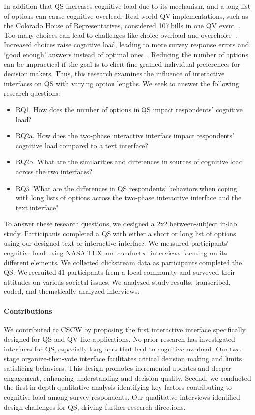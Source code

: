 In addition that QS increases cognitive load due to its mechanism, and a long list of options can cause cognitive overload. Real-world QV implementations, such as the Colorado House of Representatives, considered 107 bills in one QV event~\cite{QuadraticVotingColorado}. Too many choices can lead to challenges like choice overload and overchoice~\cite{iyengarWhenChoiceDemotivating2000, gourvilleOverchoiceAssortmentType2005}. Increased choices raise cognitive load, leading to more survey response errors and ‘good enough’ answers instead of optimal ones~\cite{lenznerCognitiveBurdenSurvey2010, blessAskingDifficultQuestions1992}. Reducing the number of options can be impractical if the goal is to elicit fine-grained individual preferences for decision makers. Thus, this research examines the influence of interactive interfaces on QS with varying option lengths. We seek to answer the following research questions:

\begin{itemize}
    \item RQ1. How does the number of options in QS impact respondents' cognitive load?
    \item RQ2a. How does the two-phase interactive interface impact respondents' cognitive load compared to a text interface?
    \item RQ2b. What are the similarities and differences in sources of cognitive load across the two interfaces?
    \item RQ3. What are the differences in QS respondents' behaviors when coping with long lists of options across the two-phase interactive interface and the text interface?
\end{itemize}

To answer these research questions, we designed a 2x2 between-subject in-lab study. Participants completed a QS with either a short or long list of options using our designed text or interactive interface. We measured participants' cognitive load using NASA-TLX and conducted interviews focusing on its different elements. We collected clickstream data as participants completed the QS. We recruited 41 participants from a local community and surveyed their attitudes on various societal issues. We analyzed study results, transcribed, coded, and thematically analyzed interviews.

\paragraph{Contributions}
We contributed to CSCW by proposing the first interactive interface specifically designed for QS and QV-like applications. No prior research has investigated interfaces for QS, especially long ones that lead to cognitive overload. Our two-stage organize-then-vote interface facilitates critical decision making and limits satisficing behaviors. This design promotes incremental updates and deeper engagement, enhancing understanding and decision quality. Second, we conducted the first in-depth qualitative analysis identifying key factors contributing to cognitive load among survey respondents. Our qualitative interviews identified design challenges for QS, driving further research directions.

